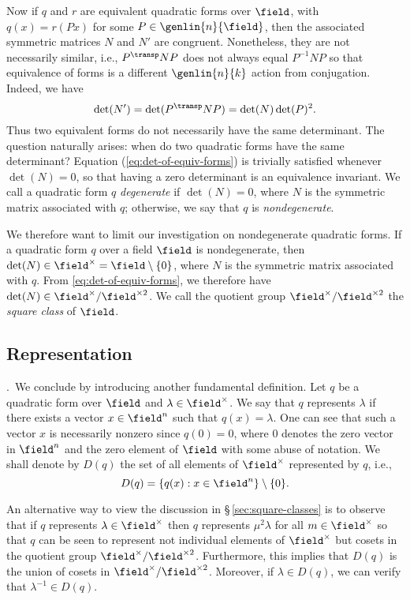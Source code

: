 Now if \(q\) and \(r\) are equivalent quadratic forms over \(\field\), with \(q(x) = r(Px)\) for some \(P \in \genlin{n}{\field}\), then the associated symmetric matrices \(N\) and \(N'\) are congruent. Nonetheless, they are not necessarily similar, i.e., \(P^{\transp}NP\) does not always equal \(P^{-1}NP\) so that equivalence of forms is a different \(\genlin{n}{k}\) action from conjugation. Indeed, we have
\begin{equation}
    \label{eq:det-of-equiv-forms}
    \det(N') = \det(P^{\transp}NP) = \det(N)\det(P)^2.
\end{equation}
Thus two equivalent forms do not necessarily have the same determinant. The question naturally arises: when do two quadratic forms have the same determinant? Equation (\ref{eq:det-of-equiv-forms}) is trivially satisfied whenever \(\det(N) = 0\), so that having a zero determinant is an equivalence invariant. We call a quadratic form \(q\) \emph{degenerate} if \(\det(N) = 0\), where \(N\) is the symmetric matrix associated with \(q\); otherwise, we say that \(q\) is \emph{nondegenerate}.

We therefore want to limit our investigation on nondegenerate quadratic forms. If a quadratic form \(q\) over a field \(\field\) is nondegenerate, then \(\det(N) \in \field^{\times} = \field \setminus \{0\}\), where \(N\) is the symmetric matrix associated with \(q\). From \eqref{eq:det-of-equiv-forms}, we therefore have \(\det(N) \in \field^{\times} / \field^{\times 2}\). We call the quotient group \(\field^{\times} / \field^{\times 2}\) the \emph{square class} of \(\field\).
\label{sec:square-classes}

\subsection{Representation}.~We conclude by introducing another fundamental definition. Let \(q\) be a quadratic form over \(\field\) and \(\lambda \in \field^{\times}\). We say that \(q\) represents \(\lambda\) if there exists a vector \(x \in \field^n\) such that \(q(x) = \lambda\). One can see that such a vector \(x\) is necessarily nonzero since \(q(0) = 0\), where \(0\) denotes the zero vector in \(\field^n\) and the zero element of \(\field\) with some abuse of notation. We shall denote by \(D(q)\) the set of all elements of \(\field^{\times}\) represented by \(q\), i.e.,\label{sec:representation}
\[
  D(q) = \{q(x) : x \in \field^n\} \setminus \{0\}.
\]

An alternative way to view the discussion in \S\,\ref{sec:square-classes} is to observe that if \(q\) represents \(\lambda \in \field^{\times}\) then \(q\) represents \(\mu^2\lambda\) for all \(m \in \field^{\times}\) so that \(q\) can be seen to represent not individual elements of \(\field^{\times}\) but cosets in the quotient group \(\field^{\times} / \field^{\times 2}\). Furthermore, this implies that \(D(q)\) is the union of cosets in \(\field^{\times} / \field^{\times 2}\). Moreover, if \(\lambda \in D(q)\), we can verify that \(\lambda^{-1} \in D(q)\).

